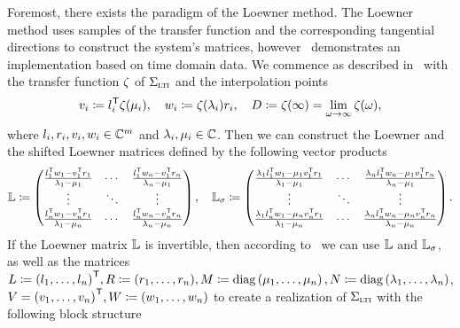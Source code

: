 Foremost, there exists the paradigm of the Loewner method.
The Loewner method uses samples of the transfer function and the corresponding tangential directions to construct the system's matrices, however~\cite{Peherstorfer2017} demonstrates an implementation based on time domain data.
We commence as described in~\cite{BGD2020} with the transfer function $\zeta$ of $\Sigma_{\textnormal{\scshape lti}}$ and the interpolation points
\begin{equation*}
    v_i \coloneqq l_i^{\mkern1mu \mathsf{T}} \zeta(\mu_i),\quad w_i \coloneqq \zeta(\lambda_i) r_i,\quad D\coloneqq \zeta(\infty) = \lim\limits_{\omega \to \infty} \zeta(\omega),
\end{equation*}
where $l_i, r_i, v_i, w_i \in \mathbb{C}^m$ and $\lambda_i, \mu_i \in \mathbb{C}$.
Then we can construct the Loewner and the shifted Loewner matrices defined by the following vector products
\begin{equation}\label{eq:loewner-matrices}
    \mathbb{L} \coloneqq \begin{pmatrix}
        \frac{l_1^{\mkern1mu \mathsf{T}} w_1  - v_1^{\mkern1mu \mathsf{T}} r_1}{\lambda_1 - \mu_1} & \cdots & \frac{l_1^{\mkern1mu \mathsf{T}} w_n  - v_1^{\mkern1mu \mathsf{T}} r_n}{\lambda_n - \mu_1} \\
        \vdots & \ddots & \vdots \\
        \frac{l_n^{\mkern1mu \mathsf{T}} w_1  - v_n^{\mkern1mu \mathsf{T}} r_1}{\lambda_1 - \mu_n} & \cdots & \frac{l_n^{\mkern1mu \mathsf{T}} w_n  - v_n^{\mkern1mu \mathsf{T}} r_n}{\lambda_n - \mu_n}
    \end{pmatrix},\quad \mathbb{L}_\sigma \coloneqq \begin{pmatrix}
        \frac{\lambda_1 l_1^{\mkern1mu \mathsf{T}} w_1 - \mu_1 v_1^{\mkern1mu \mathsf{T}} r_1}{\lambda_1 - \mu_1} & \cdots & \frac{\lambda_n l_1^{\mkern1mu \mathsf{T}} w_n - \mu_1 v_1^{\mkern1mu \mathsf{T}} r_n}{\lambda_n - \mu_1} \\
        \vdots & \ddots & \vdots \\
        \frac{\lambda_1 l_n^{\mkern1mu \mathsf{T}} w_1 - \mu_n v_n^{\mkern1mu \mathsf{T}} r_1}{\lambda_1 - \mu_n} & \cdots & \frac{\lambda_n l_n^{\mkern1mu \mathsf{T}} w_n - \mu_n v_n^{\mkern1mu \mathsf{T}} r_n}{\lambda_n - \mu_n}
    \end{pmatrix}.
\end{equation}
If the Loewner matrix $\mathbb{L}$ is invertible, then according to~\cite[Theorem~5.1]{BGD2020} we can use $\mathbb{L}$ and $\mathbb{L}_\sigma$, as well as the matrices $L \coloneqq {(l_1, \dots, l_n)}^{\mkern1mu \mathsf{T}}, R \coloneqq (r_1, \dots, r_n), M \coloneqq \mathop{}\!\mathrm{diag}\left(\mu_1, \dots, \mu_n\right), N \coloneqq \mathop{}\!\mathrm{diag}\left(\lambda_1, \dots, \lambda_n\right)$, $V = {(v_1, \dots, v_n)}^{\mkern1mu \mathsf{T}}, W \coloneqq (w_1, \dots, w_n)$ to create a realization of $\Sigma_{\textnormal{\scshape lti}}$ with the following block structure

